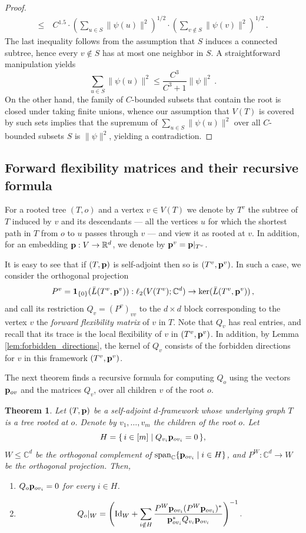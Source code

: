 \documentclass[10pt,a4paper]{amsart}
\numberwithin{equation}{section}
\newtheorem{theorem}{Theorem}[section]
\newcommand{\R}{\mathbb R}
\newcommand{\C}{\mathbb C}
\newcommand{\p}{{\bf p}}
\newcommand{\Id}{\mathrm{Id}}
\begin{document}
\begin{proof}
\begin{align*}
            \leq~
            & C^{1.5}\cdot \left(\sum_{u\in S} \|\psi(u)\|^2\right)^{1/2}\cdot\left(\sum_{v\notin S}\|\psi(v)\|^2\right)^{1/2}\,.
        \end{align*}
    The last inequality follows from the assumption that $S$ induces a connected subtree, hence every $v\notin S$ has at most one neighbor in $S$. A straightforward manipulation yields
        \[
        \sum_{u\in S}\|\psi(u)\|^2 \leq \frac{C^3}{C^3+1}\|\psi\|^2\,.   
        \]
    On the other hand, the family of $C$-bounded subsets that contain the root is closed under taking finite unions, whence our assumption that $V(T)$ is covered by such sets implies that the supremum of $\sum_{u\in S}\|\psi(u)\|^2$ over all $C$-bounded subsets $S$ is $\|\psi\|^2$, yielding a contradiction.
\end{proof}

\subsection{Forward flexibility matrices and their recursive formula}\label{sec:recursive}

For a rooted tree $(T,o)$ and a vertex $v\in V(T)$ we denote by $T^v$ the subtree of $T$ induced by $v$ and its descendants --- all the vertices $u$ for which the shortest path in $T$ from $o$ to $u$ passes through $v$ --- 
and view it as rooted at $v$. 
In addition, for an embedding $\p:V\to \R^d$, we denote by $\p^v=\p|_{T^v}$. 

It is easy to see that if $(T,\p)$ is self-adjoint then so is $(T^v,\p^v)$. In such a case, we consider the orthogonal projection
\[
P^v=\mathbf 1_{\{0\}}(\bar L(T^v,\p^v)):\ell_2(V(T^v);\C^d)\to\ker(\bar L(T^v,\p^v))\,,
\]
and call its restriction $Q_v=(P^v)_{vv}$ to the $d\times d$ block corresponding to the vertex $v$ the {\em forward flexibility matrix} of $v$ in $T$.
Note that $Q_v$ has real entries, and recall that its trace is the local flexibility of $v$ in $(T^v,\p^v)$. 
In addition, by Lemma \ref{lem:forbidden_directions}, the kernel of $Q_v$ consists of the forbidden directions for $v$ in this framework $(T^v,\p^v)$.

The next theorem finds a recursive formula for computing $Q_o$ using the vectors $\p_{ov}$ and the matrices $Q_v$, over all children $v$ of the root $o$.


\begin{theorem}\label{thm:recursion}
Let $(T,\p)$ be a self-adjoint $d$-framework whose underlying graph $T$ is a tree rooted at $o$. Denote by
$v_1,\dots,v_m$ the children of the root $o$. Let
\[
H=\{\,i\in[m]\mid Q_{v_i}\p_{ov_i}=0\,\},
\]
$W\le \C^d$ be the orthogonal complement of
$\mathrm{span}_{\C}\{\p_{ov_i}\mid i\in H\}$, and $P^W:\C^d\to W$ be the orthogonal projection. Then,
\begin{enumerate}
\item $Q_o\p_{ov_i}=0$ for every $i\in H$.
\item
\[
Q_o|_W
=
\left(
\Id_W+\sum_{i\notin H}\frac{P^W\p_{ov_i}(P^W\p_{ov_i})^*}{\p_{ov_i}^*Q_{v_i}\p_{ov_i}}
\right)^{-1}.
\]
\end{enumerate}
\end{theorem}
\end{document}
